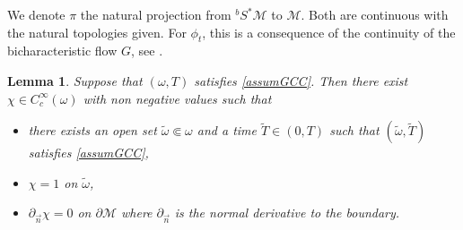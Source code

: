 \documentclass[JEP,XML,SOM,Unicode,published]{cedram}
\newtheorem{lemma}[theorem]{Lemma}
\theoremstyle{definition}
\let\mc\mathcal
\newcommand{\M}{\mc{M}}
\begin{document}
We denote $\pi$ the natural projection from $^bS^*\M$ to $\M$. Both are continuous with the natural topologies given. For $\phi_t$, this is a consequence of the continuity of the bicharacteristic flow $G$, see \cite[Lem.\,3.31]{MS:78}.
\begin{lemma}\label{lemma:gcc-smaller-subset}
Suppose that $(\omega, T)$ satisfies \ref{assumGCC}. Then there exist $\chi\in C^{\infty}_c(\omega)$ with non negative values such that
\begin{itemize}
\item there exists an open set $\widetilde{\omega}\Subset \omega$ and a time $\widetilde{T}\in(0,T)$ such that $(\widetilde{\omega}, \widetilde{T})$ satisfies \ref{assumGCC},
\item $\chi=1$ on $\widetilde{\omega}$,
\item $\partial_{\vec n} \chi=0$ on $\partial \M$ where $\partial_{\vec n}$ is the normal derivative to the boundary.
\end{itemize}
\end{lemma}
\end{document}
